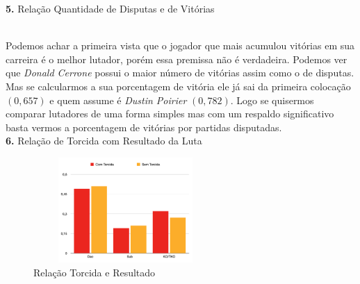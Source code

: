 \documentclass{article}
\begin{document}
\newpage
\textbf{5.} Relação Quantidade de Disputas e de Vitórias\\

\begin{figure}[H]
\centering
{}
\end{figure} \\

Podemos achar a primeira vista que o jogador que mais acumulou vitórias em sua carreira é o melhor lutador, porém essa premissa não é verdadeira. Podemos ver que \textit{Donald Cerrone} possui o maior número de vitórias assim como o de disputas. Mas se calcularmos a sua porcentagem de vitória ele já sai da primeira colocação $(0,657)$ e quem assume é \textit{Dustin Poirier} $ (0,782 )$. Logo se quisermos comparar lutadores de uma forma simples mas com um respaldo significativo basta vermos a porcentagem de vitórias por partidas disputadas.\\

\newpage
\textbf{6.} Relação de Torcida com Resultado da Luta
\begin{figure}[H]
    \centering
    \includegraphics[width=7cm,height=4cm]{Relação Torcida e Resultado.png}
    \caption{Relação Torcida e Resultado}
    \label{fig:my_label}
\end{figure}
\end{document}
